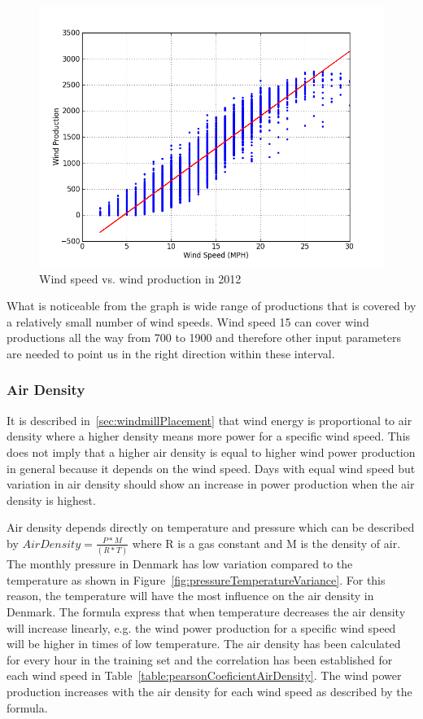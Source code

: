 \begin{figure}[H]
\centering
\includegraphics[width=0.99\linewidth,natwidth=898,natheight=587]{billeder/WindSpeedVsProduction.png}
\caption{Wind speed vs. wind production in 2012}
\label{fig:windVsProd}
\end{figure}

What is noticeable from the graph is wide range of productions that is covered by a relatively small number of wind speeds. Wind speed 15 can cover wind productions all the way from 700 to 1900 and therefore other input parameters are needed to point us in the right direction within these interval. 

\subsubsection{Air Density}
It is described in~\ref{sec:windmillPlacement} that wind energy is proportional to air density where a higher density means more power for a specific wind speed. This does not imply that a higher air density is equal to higher wind power production in general because it depends on the wind speed. Days with equal wind speed but variation in air density should show an increase in power production when the air density is highest. 

Air density depends directly on temperature and pressure which can be described by $Air Density=\frac{P*M}{(R*T)}$ where R is a gas constant and M is the density of air. The monthly pressure in Denmark has low variation compared to the temperature as shown in Figure~\ref{fig:pressureTemperatureVariance}. For this reason, the temperature will have the most influence on the air density in Denmark. The formula express that when temperature decreases the air density will increase linearly, e.g. the wind power production for a specific wind speed will be higher in times of low temperature. The air density has been calculated for every hour in the training set and the correlation has been established for each wind speed in Table~\ref{table:pearsonCoeficientAirDensity}. The wind power production increases with the air density for each wind speed as described by the formula.

